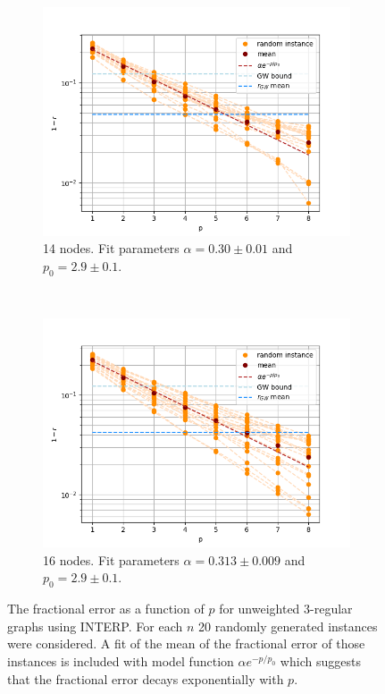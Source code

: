 \begin{figure}[H]
	\centering
	\begin{subfigure}[t]{0.45\textwidth}
		\centering
		\includegraphics[width=\textwidth]{figures/interp/FOM_(unweighted)/EXP/FOM_3-regular-14-nodal_exp}
		\caption{14 nodes. Fit parameters $\alpha = 0.30 \pm 0.01$ and $p_0 = 2.9 \pm 0.1$.}
	\end{subfigure}
	~
	\begin{subfigure}[t]{0.45\textwidth}
		\centering
		\includegraphics[width=\textwidth]{figures/interp/FOM_(unweighted)/EXP/FOM_3-regular-16-nodal_exp}
		\caption{16 nodes. Fit parameters $\alpha = 0.313 \pm 0.009$ and $p_0 = 2.9 \pm 0.1$.}
	\end{subfigure}
	\caption{The fractional error as a function of $p$ for unweighted 3-regular graphs using INTERP. For each $n$ 20 randomly generated instances were considered. A fit of the mean of the fractional error of those instances is included with model function $\alpha e^{-p/p_0}$ which suggests that the fractional error decays exponentially with $p$.}
\end{figure}

